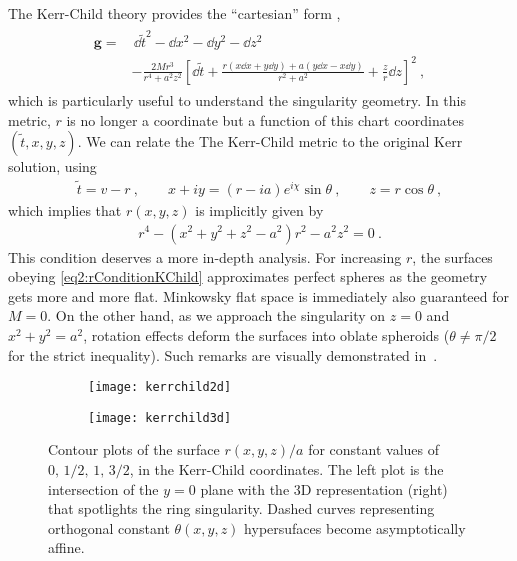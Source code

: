 The Kerr-Child theory provides the ``cartesian'' form \cite{Teukolsky2015}, 
\begin{align}
    \begin{split}
        \bm{g} = & \, \dd \tilde{t}^2 - \dd x^2 - \dd y^2 - \dd z^2 \\
        & - \frac{2 M r^3}{r^4 + a^2 z^2} \left[ \dd \tilde{t} + \frac{r (x \dd x + y \dd y) + a ( y \dd x - x \dd y)}{r^2+a^2} + \frac{z}{r} \dd z \right]^2 ~,
    \end{split}
    \label{eq2:KerrChild}
\end{align}
which is particularly useful to understand the singularity geometry.
In this metric, $r$ is no longer a coordinate but a function of this chart coordinates $(\tilde{t},x,y,z)$.
We can relate the The Kerr-Child metric to the original Kerr solution, using
\begin{align}
    \tilde{t} = v - r ~, \qquad x+ i y = (r -i a) e^{i \chi} \sin\theta ~,\qquad z=r\cos\theta ~,
    \label{eq2:InEFtoKChild}
\end{align}
which implies that $r(x,y,z)$ is implicitly given by
\begin{align}
    r^4 - (x^2+y^2+z^2-a^2)r^2 -a^2 z^2 = 0 ~.
    \label{eq2:rConditionKChild}
\end{align}
This condition deserves a more in-depth analysis.
For increasing $r$, the surfaces obeying \eqref{eq2:rConditionKChild} approximates perfect spheres as the geometry gets more and more flat.
Minkowsky flat space is immediately also guaranteed for $M=0$.
On the other hand, as we approach the singularity on $z=0$ and $x^2+y^2 = a^2$, rotation effects deform the surfaces into oblate spheroids ($\theta\ne\pi/2$ for the strict inequality).
Such remarks are visually demonstrated in~.

\begin{figure}[h]
    \centering
    \begin{subfigure}[c]{0.45\textwidth}
        \texttt{[image: kerrchild2d]}
    \end{subfigure}
    \hspace{1cm}
    \begin{subfigure}[c]{0.35\textwidth}
        \texttt{[image: kerrchild3d]}
    \end{subfigure}
    \caption{Contour plots of the surface $r(x,y,z)/a$ for constant values of $0,\,1/2,\,1,\,3/2$, in the Kerr-Child coordinates. The left plot is the intersection of the $y=0$ plane with the 3D representation (right) that spotlights the ring singularity. Dashed curves representing orthogonal constant $\theta(x,y,z)$ hypersufaces become asymptotically affine.}\label{fig2:kerrchild}
\end{figure}


